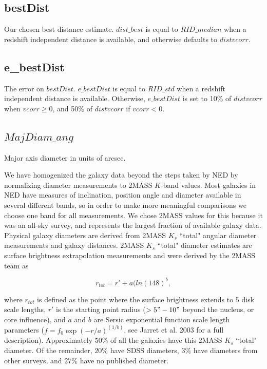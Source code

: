 \documentclass[iop]{emulateapj-rtx4}
\begin{document}
\subsection{bestDist}
Our chosen best distance estimate. $dist\_best$ is equal to $RID\_median$ when a redshift independent distance is available, and otherwise defaults to $distvcorr$.

\subsection{e\_bestDist}
The error on $bestDist$. $e\_bestDist$ is equal to $RID\_std$ when a redshift independent distance is available. Otherwise, $e\_bestDist$ is set to 10\% of $distvcorr$ when $vcorr \geq 0$, and 50\% of $distvcorr$ if $vcorr < 0$.

\subsection{$MajDiam\_ang$} \label{diameters}
Major axis diameter in units of arcsec.

We have homogenized the galaxy data beyond the steps taken by NED by normalizing diameter measurements to 2MASS $K$-band values. Most galaxies in NED have measures of inclination, position angle and diameter available in several different bands, so in order to make more meaningful comparisons we choose one band for all measurements. We chose 2MASS values for this because it was an all-sky survey, and represents the largest fraction of available galaxy data. Physical galaxy diameters are derived from 2MASS $K_s$ ``total" angular diameter measurements and galaxy distances. 2MASS $K_s$ ``total" diameter estimates are surface brightness extrapolation measurements and were derived by the 2MASS team as 

\begin{equation}
r_{tot} = r' + a(ln(148)^b,
\end{equation}

\noindent where $r_{tot}$ is defined as the point where the surface brightness extends to 5 disk scale lengths, $r'$ is the starting point radius ($>5" - 10"$ beyond the nucleus, or core influence), and $a$ and $b$ are Sersic exponential function scale length parameters ($f = f_0 \exp{(-r/a)}^{(1/b)}$, see Jarret et al. 2003 for a full description). Approximately $50\%$ of all the galaxies have this 2MASS $K_s$ ``total" diameter. Of the remainder, $20\%$ have SDSS diameters, $3\%$ have diameters from other surveys, and $27\%$ have no published diameter. 
\end{document}
